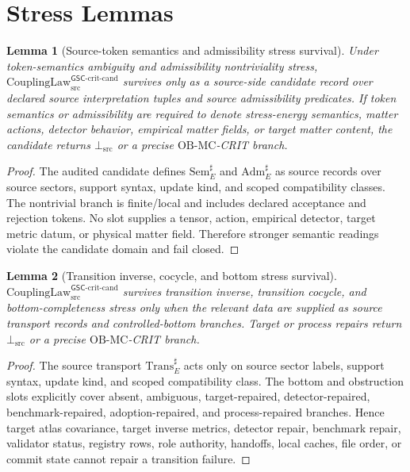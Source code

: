 \documentclass[11pt]{article}
\newcommand{\CouplingLawCrit}{\mathrm{CouplingLaw}^{\mathsf{GSC}\mbox{-}\mathrm{crit}\mbox{-}\mathrm{cand}}_{\mathrm{src}}}
\newcommand{\BottomSrc}{\bot_{\mathrm{src}}}
\newcommand{\Sem}{\mathrm{Sem}}
\newcommand{\Adm}{\mathrm{Adm}}
\newcommand{\Trans}{\mathrm{Trans}}
\newcommand{\OBMC}{\mathrm{OB}\mbox{-}\mathrm{MC}}
\newtheorem{lemma}{Lemma}
\begin{document}
\section{Stress Lemmas}

\begin{lemma}[Source-token semantics and admissibility stress survival]
Under token-semantics ambiguity and admissibility nontriviality stress,
\(\CouplingLawCrit\) survives only as a source-side candidate record over
declared source interpretation tuples and source admissibility predicates. If
token semantics or admissibility are required to denote stress-energy
semantics, matter actions, detector behavior, empirical matter fields, or
target matter content, the candidate returns \(\BottomSrc\) or a precise
\(\OBMC\)-CRIT branch.
\end{lemma}

\begin{proof}
The audited candidate defines \(\Sem_E^{\sharp}\) and
\(\Adm_E^{\sharp}\) as source records over source sectors, support syntax,
update kind, and scoped compatibility classes. The nontrivial branch is
finite/local and includes declared acceptance and rejection tokens. No slot
supplies a tensor, action, empirical detector, target metric datum, or
physical matter field. Therefore stronger semantic readings violate the
candidate domain and fail closed.
\end{proof}

\begin{lemma}[Transition inverse, cocycle, and bottom stress survival]
\(\CouplingLawCrit\) survives transition inverse, transition cocycle, and
bottom-completeness stress only when the relevant data are supplied as source
transport records and controlled-bottom branches. Target or process repairs
return \(\BottomSrc\) or a precise \(\OBMC\)-CRIT branch.
\end{lemma}

\begin{proof}
The source transport \(\Trans_E^{\sharp}\) acts only on source sector labels,
support syntax, update kind, and scoped compatibility class. The bottom and
obstruction slots explicitly cover absent, ambiguous, target-repaired,
detector-repaired, benchmark-repaired, adoption-repaired, and
process-repaired branches. Hence target atlas covariance, target inverse
metrics, detector repair, benchmark repair, validator status, registry rows,
role authority, handoffs, local caches, file order, or commit state cannot
repair a transition failure.
\end{proof}
\end{document}
